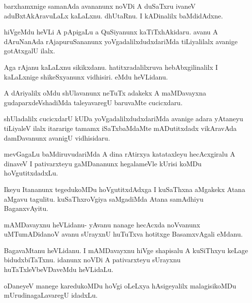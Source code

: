 \documentclass{article}
\begin{document}
\begin{mng}%
barxhamxnige samanAda avananunx noVDi A duSaTxru ivaneV
aduBxtAkAravuLaLx kaLaLxnu. dhUtaRnu. I kADinalilx baMdidAdxne.
\end{mng}

\begin{mng}%
hiVgeMdu heVLi A pApigaLu a QuSiyanunx kaTiTxhAkidaru.
avanu A dAruNanAda rAjapuruSananunx yoVgadalilxdudxdariMda tiLiyalilalx
avanige gotAtxgalU ilalx.
\end{mng}

\begin{mng}%
Aga rAjanu kaLaLxnu sikikxdanu. hatitxradalilxruva hebAbxgilinalilx
I kaLaLxnige shikeSxyanunx vidhisiri. eMdu heVLidanu.
\end{mng}

\begin{mng}%
A dAriyalilx oMdu shUlavanunx neTuTx adakekx A maMDavayxna
gudaparxdeVshadiMda taleyavaregU baruvaMte cucicxdaru.
\end{mng}

\begin{mng}%
shUladalilx cucicxdarU kUDa yoVgadalilxdudxdariMda avanige
adara yAtaneyu tiLiyaleV ilalx itararige tamamx iSaTxbaMdaMte mADutitxdadx
vikAravAda damDavanunx avanigU vidhisidaru.
\end{mng}

\begin{mng}%
mevGagaLu baMdiruvudariMda A dina rAtirxya katataxleyu
hecAcxgiralu A dinaveV I pativarxteyu gaMDananunx hegalameVle kUrisi
koMDu hoVgutitxdadxLu.
\end{mng}

\begin{mng}%
Ikeyu Itananunx tegedukoMDu hoVgutitxdAdxga I kuSaThxna
aMgakekx Atana aMgavu tagulitu. kuSaThxroVgiya saMgadiMda Atana samAdhiyu
BaganxvAyitu.
\end{mng}

\begin{mng}%
mAMDavayxnu heVLidanu- yAvanu nanage hecAcxda noVvanunx
uMTumADidanoV avanu sUrayxnU huTuTxva hotitxge BasamxvAgali eMdanu.
\end{mng}

\begin{mng}%
BagavaMtanu heVLidanu. I mAMDavayxnu hiVge shapisalu A
kuSiThxyu keLage bidudxbiTaTxnu. idanunx noVDi A pativarxteyu sUrayxnu
huTaTxleVbeVDaveMdu heVLidaLu.
\end{mng}

\begin{mng}%
oDaneyeV manege karedukoMDu hoVgi oLeLxya hAsigeyalilx
malagisikoMDu mUrudinagaLavaregU idadxLu.
\end{mng}
\end{document}
